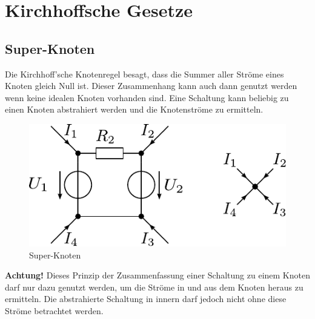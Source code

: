 



\section{Kirchhoffsche Gesetze}

\subsection{Super-Knoten}
Die Kirchhoff'sche Knotenregel besagt, dass die Summer aller Ströme eines Knoten gleich Null ist.
Dieser Zusammenhang kann auch dann genutzt werden wenn keine idealen Knoten vorhanden sind.
Eine Schaltung kann beliebig zu einen Knoten abstrahiert werden und die Knotenströme zu ermitteln.

\begin{figure}[h!]
\centering
\includegraphics[scale=\schscale]{supernode_sch.pdf}
\caption{Super-Knoten}
\label{sch:supernode}
\end{figure}

\noindent
\textbf{Achtung!} Dieses Prinzip der Zusammenfassung einer Schaltung zu einem Knoten darf nur dazu genutzt werden, um die Ströme in und aus dem Knoten heraus zu ermitteln. Die abstrahierte Schaltung in innern darf jedoch nicht ohne diese Ströme betrachtet werden. 
